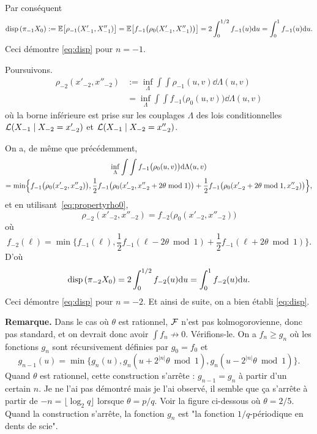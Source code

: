 \documentclass[12pt,a4paper]{article}
\begin{document}
Par conséquent 
$$
\textrm{disp}\,(\pi_{-1}X_0) := \mathbb{E}\bigl[\rho_{-1}(X'_{-1}, X''_{-1})\bigr] 
 = \mathbb{E}\bigl[f_{-1}\bigl(\rho_0(X'_{-1}, X''_{-1})\bigr)\bigr] 
 = 2\int_0^{1/2} f_{-1}(u) \mathrm{d} u = \int_0^1 f_{-1}(u) \mathrm{d} u.
$$
Ceci démontre \eqref{eq:disp} pour $n=-1$.


Poursuivons. 
\begin{align*}
\rho_{-2}(x'_{-2}, x''_{-2}) & := \inf_{\Lambda} \int\int\rho_{-1}(u, v) \dd\Lambda(u,v) \\
& = \inf_{\Lambda} \int\int f_{-1}\bigl(\rho_0(u, v)\bigr) \dd\Lambda(u,v)
\end{align*}
où la borne inférieure est prise sur les couplages $\Lambda$ des lois conditionnelles 
$\mathcal{L}(X_{-1} \mid X_{-2}=x'_{-2})$ et $\mathcal{L}(X_{-1} \mid X_{-2}=x''_{-2})$.  

On a, de même que précédemment, 
\begin{multline*}
\inf_{\Lambda} \int\int f_{-1}\bigl(\rho_0(u, v)\bigr) \mathrm{d}\Lambda(u,v)  \\ = 
\min\Bigl\{ 
f_{-1}\bigl(\rho_0(x'_{-2}, x''_{-2})\bigr), 
\frac12 f_{-1}\bigl(\rho_0(x'_{-2}, x''_{-2} + 2\theta \bmod 1)\bigr) 
+ \frac12 f_{-1}\bigl(\rho_0(x'_{-2}+ 2\theta \bmod 1, x''_{-2})\bigr)
\Bigr\},
\end{multline*}
et en utilisant~\eqref{eq:propertyrho0}, 
$$
\rho_{-2}(x'_{-2}, x''_{-2}) = 
f_{-2}\bigl(\rho_0(x'_{-2}, x''_{-2})\bigr)
$$
où 
$$
\boxed{
f_{-2}(\ell) = \min\bigl\{f_{-1}(\ell), 
\frac12 f_{-1}(\ell-2\theta\bmod 1) +\frac12 f_{-1}(\ell+2\theta \bmod1)\bigr\}
}.
$$
D'où 
$$
\textrm{disp}\,(\pi_{-2}X_0)  = 2\int_0^{1/2} f_{-2}(u) \mathrm{d} u = \int_0^1 f_{-2}(u) \mathrm{d} u.
$$
Ceci démontre \eqref{eq:disp} pour $n=-2$. 
Et ainsi de suite, on a bien établi \eqref{eq:disp}.


\bigskip
\noindent
{\bf \large Remarque.} 
Dans le cas où $\theta$ est rationnel, $\mathcal{F}$ n'est pas kolmogorovienne, donc pas standard, et on devrait donc avoir 
$\int f_n \not\to 0$. 
Vérifions-le. 
On a $f_n \geq g_n$ où les fonctions $g_n$ sont récursivement définies par $g_0=f_0$ et $$g_{n-1}(u) = \min\bigl\{g_{n}(u), g_{n}(u+2^{|n|}\theta \bmod 1), g_{n}(u-2^{|n|}\theta \bmod1) \bigr\}.$$ Quand $\theta$ est rationnel, cette construction s'arrête : $g_{n-1}=g_n$ à partir d'un certain $n$. Je ne l'ai pas démontré mais je l'ai observé, il semble que ça s'arrête à partir de $-n = \lfloor\log_2 q\rfloor$ lorsque $\theta=p/q$. Voir la figure ci-dessous où $\theta=2/5$. Quand la construction s'arrête, la fonction $g_n$ est "la fonction $1/q$-périodique en dents de scie".
\end{document}
